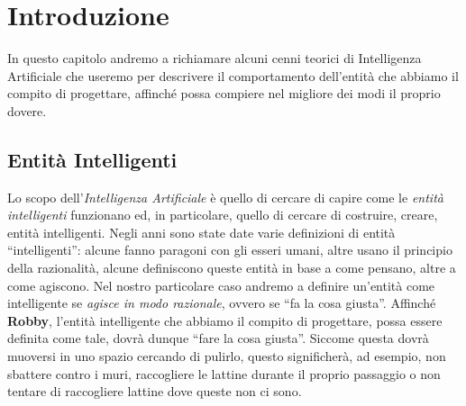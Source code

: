 \chapter{Introduzione}
In questo capitolo andremo a richiamare alcuni cenni teorici di Intelligenza
Artificiale che useremo per descrivere il comportamento dell'entità che abbiamo
il compito di progettare, affinché possa compiere nel migliore dei modi il
proprio dovere.

\section{Entità Intelligenti}
Lo scopo dell'\textit{Intelligenza Artificiale} è quello di cercare di capire
come le \textit{entità intelligenti} funzionano ed, in particolare, quello di
cercare di costruire, creare, entità intelligenti.\newline
Negli anni sono state date varie definizioni di entità ``intelligenti'': alcune
fanno paragoni con gli esseri umani, altre usano il principio della razionalità,
alcune definiscono queste entità in base a come pensano, altre a come agiscono.
Nel nostro particolare caso andremo a definire un'entità come intelligente se
\textit{agisce in modo razionale}, ovvero se ``fa la cosa giusta''.\newline
Affinché \textbf{Robby}, l'entità intelligente che abbiamo il compito di
progettare, possa essere definita come tale, dovrà dunque ``fare la cosa
giusta''. Siccome questa dovrà muoversi in uno spazio cercando di pulirlo,
questo significherà, ad esempio, non sbattere contro i muri, raccogliere le
lattine durante il proprio passaggio o non tentare di raccogliere lattine dove
queste non ci sono.

